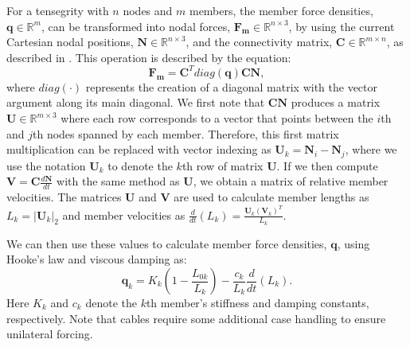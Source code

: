 {For a tensegrity with $n$ nodes and $m$ members, the member force densities, 
$\boldsymbol{q}\in\mathbb{R}^{m}$, can be transformed into nodal forces,
$\boldsymbol{F_m}\in\mathbb{R}^{n\times 3}$, by using the current Cartesian nodal positions,
$\boldsymbol{N}\in\mathbb{R}^{n\times 3}$, and the connectivity matrix,
$\boldsymbol{C}\in\mathbb{R}^{m\times n}$, as described in \cite{skelton2009tensegrity}. This operation is described by the equation:
$$
\boldsymbol{F_m} = \boldsymbol{C}^{T} diag(\boldsymbol{q}) \boldsymbol{C} \boldsymbol{N},
$$
where $diag(\cdot)$ represents the creation of a diagonal matrix with the vector argument along its main diagonal.
We first note that $\boldsymbol{C} \boldsymbol{N}$ produces a matrix $\boldsymbol{U}\in\mathbb{R}^{m\times 3}$ where each row corresponds to a vector that points between the $i$th and $j$th nodes spanned by each member. 
Therefore, this first matrix multiplication can be replaced with vector indexing as $\boldsymbol{U}_{k} = \boldsymbol{N}_{i} - \boldsymbol{N}_{j}$,
where we use the notation $\boldsymbol{U}_{k}$ to denote the $k$th row of matrix $\boldsymbol{U}$. If we then compute $\boldsymbol{V}=\boldsymbol{C}\frac{d\boldsymbol{N}}{dt}$ with the same method
as $\boldsymbol{U}$, we obtain a matrix of relative member velocities.
The matrices $\boldsymbol{U}$ and $\boldsymbol{V}$ are used to calculate member lengths as $L_k = |\boldsymbol{U}_k|_2$ and member velocities as $\frac{d}{dt}(L_k) = \frac{\boldsymbol{U}_k(\boldsymbol{V}_k)^T}{L_k}.$

We can then use these values to calculate member force densities, $\boldsymbol{q}$, using Hooke's law and viscous damping as:
$$
\boldsymbol{q}_k = K_k(1 - \frac{L_{0k}}{L_k}) - \frac{c_k}{L_k} \frac{d}{dt}(L_k).
$$
Here $K_k$ and $c_k$ denote the $k$th member's stiffness and damping constants, respectively.
Note that cables require some additional case handling to ensure unilateral forcing.

}
